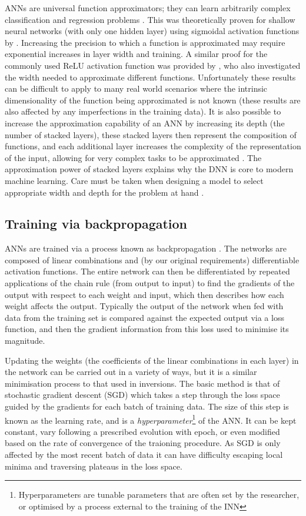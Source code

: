 ANNs are universal function approximators; they can learn arbitrarily complex classification and regression problems \citep{Rumelhart1986,1989Cybenko}.
This was theoretically proven for shallow neural networks (with only one hidden layer) using sigmoidal activation functions by \citet{1989Cybenko}.
Increasing the precision to which a function is approximated may require exponential increases in layer width and training.
A similar proof for the commonly used ReLU activation function was provided by \citet{Lu2017}, who also investigated the width needed to approximate different functions.
Unfortunately these results can be difficult to apply to many real world scenarios where the intrinsic dimensionality of the function being approximated is not known (these results are also affected by any imperfections in the training data).
It is also possible to increase the approximation capability of an ANN by increasing its depth (the number of stacked layers), these stacked layers then represent the composition of functions, and each additional layer increases the complexity of the representation of the input, allowing for very complex tasks to be approximated \citep{Raschka2015}.
The approximation power of stacked layers explains why the DNN is core to modern machine learning.
Care must be taken when designing a model to select appropriate width and depth for the problem at hand \citep{Lu2017}.

\subsection{Training via backpropagation}

ANNs are trained via a process known as backpropagation \citep{Rumelhart1986}.
The networks are composed of linear combinations and (by our original requirements) differentiable activation functions.
The entire network can then be differentiated by repeated applications of the chain rule (from output to input) to find the gradients of the output with respect to each weight and input, which then describes how each weight affects the output.
Typically the output of the network when fed with data from the training set is compared against the expected output via a loss function, and then the gradient information from this loss used to minimise its magnitude.

Updating the weights (the coefficients of the linear combinations in each layer) in the network can be carried out in a variety of ways, but it is a similar minimisation process to that used in inversions.
The basic method is that of stochastic gradient descent (SGD) which takes a step through the loss space guided by the gradients for each batch of training data.
The size of this step is known as the learning rate, and is a \emph{hyperparameter}\footnote{Hyperparameters are tunable parameters that are often set by the researcher, or optimised by a process external to the training of the INN} of the ANN.
It can be kept constant, vary following a prescribed evolution with epoch, or even modified based on the rate of convergence of the traioning procedure.
As SGD is only affected by the most recent batch of data it can have difficulty escaping local minima and traversing plateaus in the loss space.

